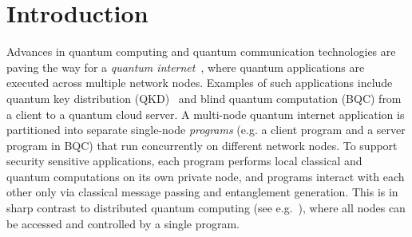 \section{Introduction}
\label{qoala:sec:introduction}



Advances in quantum computing and quantum communication technologies are paving the way for a \textit{quantum internet}~\cite{wehner2018quantum, kimble2008quantum}, where quantum applications are executed across multiple network nodes.
Examples of such applications include quantum key distribution (QKD)~\cite{bennett2014quantum, ekert1991quantum} and blind quantum computation (BQC) \cite{broadbent2009universal, arrighi2006blind} from a client to a quantum cloud server.
A multi-node quantum internet application is partitioned into separate single-node \textit{programs} (e.g. a client program and a server program in BQC) that run concurrently on different network nodes. To support security sensitive applications, each program performs local classical and quantum computations on its own private node, and programs interact with each other only via classical message passing and entanglement generation. This is in sharp contrast to distributed quantum computing (see e.g.~\cite{cacciapuoti2019quantum}), where all nodes can be accessed and controlled by a single program. 


